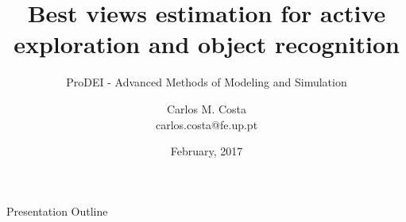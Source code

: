 





\title{Best views estimation for active exploration and object recognition}
\subtitle{ProDEI - Advanced Methods of Modeling and Simulation}
\author{Carlos M. Costa\texorpdfstring{\\{\ttfamily carlos.costa@fe.up.pt}}{}}
\date{February, 2017}




\begin{frame}
	\titlepage
\end{frame}




\begin{frame}{Presentation Outline}
	\begingroup
	\scriptsize
	\tableofcontents
	\endgroup
\end{frame}












